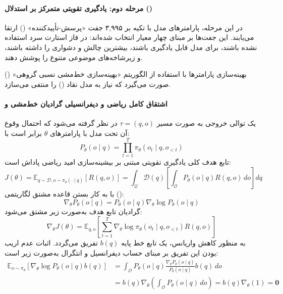\paragraph*{مرحله دوم: یادگیری تقویتی متمرکز بر استدلال ()}
در این مرحله، پارامترهای مدل با تکیه بر ۳,۹۹۵ جفت «پرسش-تأییدکننده» () ارتقا می‌یابند. این جفت‌ها بر مبنای چهار معیار انتخاب شده‌اند: در فاز استارت سرد استفاده نشده باشند، برای مدل قابل یادگیری باشند، بیشترین چالش و دشواری را داشته باشند، و زیرشاخه‌های موضوعی متنوع را پوشش دهند.

بهینه‌سازی پارامترها با استفاده از الگوریتم «بهینه‌سازی خط‌مشی نسبی گروهی» () \cite{shao2024deepseekmath} صورت می‌گیرد که نیاز به مدل نقاد () را منتفی می‌سازد.

\paragraph*{اشتقاق کامل ریاضی و دیفرانسیلی گرادیان خط‌مشی و }
یک توالی خروجی به صورت مسیر $\tau = (q, o)$ در نظر گرفته می‌شود که احتمال وقوع آن تحت مدل با پارامترهای $\theta$ برابر است با:
\begin{equation}
    P_\theta(o \mid q) = \prod_{t=1}^{T} \pi_\theta(o_t \mid q, o_{<t})
\end{equation}
تابع هدف کلی یادگیری تقویتی مبتنی بر بیشینه‌سازی امید ریاضی پاداش است:
\begin{equation}
    J(\theta) = \mathbb{E}_{q \sim \mathcal{D}, o \sim \pi_\theta(\cdot \mid q)} [R(q, o)] = \int_{\mathcal{Q}} \mathcal{D}(q) \left[ \int_{\mathcal{O}} P_\theta(o \mid q) R(q, o) \, do \right] dq
\end{equation}
با به کار بستن قاعده مشتق لگاریتمی ():
\begin{equation}
    \nabla_\theta P_\theta(o \mid q) = P_\theta(o \mid q) \nabla_\theta \log P_\theta(o \mid q)
\end{equation}
گرادیان تابع هدف به‌صورت زیر مشتق می‌شود:
\begin{equation}
    \nabla_\theta J(\theta) = \mathbb{E}_{q, o} \left[ \sum_{t=1}^T \nabla_\theta \log \pi_\theta(o_t \mid q, o_{<t}) R(q, o) \right]
\end{equation}
به منظور کاهش واریانس، یک تابع خط پایه $b(q)$ تفریق می‌گردد. اثبات عدم اریب بودن این تفریق بر مبنای حساب دیفرانسیل و انتگرال به‌صورت زیر است:
\begin{equation}
\begin{aligned}
    \mathbb{E}_{o \sim \pi_\theta} \left[ \nabla_\theta \log P_\theta(o \mid q) b(q) \right] &= \int_{\mathcal{O}} P_\theta(o \mid q) \frac{\nabla_\theta P_\theta(o \mid q)}{P_\theta(o \mid q)} b(q) \, do \\
    &= b(q) \nabla_\theta \left( \int_{\mathcal{O}} P_\theta(o \mid q) \, do \right) = b(q) \nabla_\theta (1) = \mathbf{0}
\end{aligned}
\end{equation}

